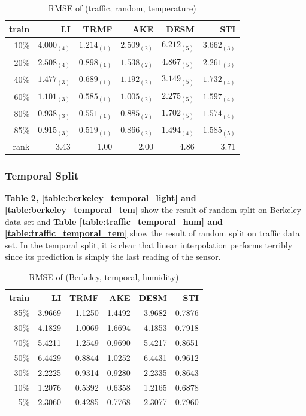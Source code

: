 \begin{table} [htbp]
\centering
\caption{RMSE of (traffic, random, temperature)}
\label{table:traffic_random_tem}
\begin{tabular}{ r | r r r r r}
	train	&LI	&TRMF	&AKE	&DESM	&STI\\ \hline
	10\% & $ 4.000_{(4)} $ & $ \mathbf{ 1.214_{(1)} } $ & $ 2.509_{(2)} $ & $ 6.212_{(5)} $ & $ 3.662_{(3)} $ \\
	20\% & $ 2.508_{(4)} $ & $ \mathbf{ 0.898_{(1)} } $ & $ 1.538_{(2)} $ & $ 4.867_{(5)} $ & $ 2.261_{(3)} $ \\
	40\% & $ 1.477_{(3)} $ & $ \mathbf{ 0.689_{(1)} } $ & $ 1.192_{(2)} $ & $ 3.149_{(5)} $ & $ 1.732_{(4)} $ \\
	60\% & $ 1.101_{(3)} $ & $ \mathbf{ 0.585_{(1)} } $ & $ 1.005_{(2)} $ & $ 2.275_{(5)} $ & $ 1.597_{(4)} $ \\
	80\% & $ 0.938_{(3)} $ & $ \mathbf{ 0.551_{(1)} } $ & $ 0.885_{(2)} $ & $ 1.702_{(5)} $ & $ 1.574_{(4)} $ \\
	85\% & $ 0.915_{(3)} $ & $ \mathbf{ 0.519_{(1)} } $ & $ 0.866_{(2)} $ & $ 1.494_{(4)} $ & $ 1.585_{(5)} $ \\ \hline
	rank &3.43 &1.00 &2.00 &4.86 &3.71 \\
\end{tabular}
\end{table}

\subsubsection{Temporal Split}
\textbf{Table \ref{table:berkeley_temporal_hum}, \ref{table:berkeley_temporal_light} and \ref{table:berkeley_temporal_tem}} show the result of random split on Berkeley data set and \textbf{Table \ref{table:traffic_temporal_hum} and \ref{table:traffic_temporal_tem}} show the result of random split on traffic data set.
In the temporal split, it is clear that linear interpolation performs terribly since its prediction is simply the last reading of the sensor.

\begin{table}[htbp]
\centering
\caption{RMSE of (Berkeley, temporal, humidity)}
\label{table:berkeley_temporal_hum}
\begin{tabular}{ r | r r r r r}
	train	&LI	&TRMF	&AKE	&DESM	&STI\\ \hline
	85\%	&3.9669	&1.1250	&1.4492	&3.9682	&0.7876\\ 
	80\%	&4.1829	&1.0069	&1.6694	&4.1853	&0.7918\\
	70\%	&5.4211	&1.2549	&0.9690	&5.4217	&0.8651\\
	50\%	&6.4429	&0.8844	&1.0252	&6.4431	&0.9612\\
	30\%	&2.2225	&0.9314	&0.9280	&2.2335	&0.8643\\
	10\%	&1.2076	&0.5392	&0.6358	&1.2165	&0.6878\\
	 5\%	&2.3060	&0.4285	&0.7768	&2.3077	&0.7960
\end{tabular}
\end{table}

